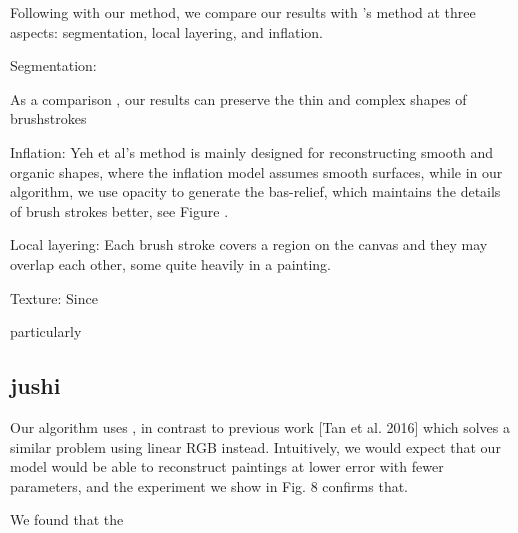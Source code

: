 Following with our method, we compare our results with \cite{yeh2017interactive}'s method at three aspects: segmentation, local layering, and inflation.

Segmentation: 

As a comparison , our results can preserve the thin and complex shapes of brushstrokes     

Inflation: 
Yeh et al's method is mainly designed for reconstructing smooth and organic shapes, where the inflation model assumes smooth surfaces, while in our algorithm, we use opacity to generate the bas-relief, which maintains the details of brush strokes better, see Figure .

Local layering: 
Each brush stroke covers a region on the canvas and they may overlap
each other, some quite heavily in a painting. 

Texture:  
Since \cite{yeh2017interactive}



particularly 


\subsection{jushi}

Our algorithm uses  , in contrast to previous  work [Tan et al. 2016] which solves a similar problem using linear RGB instead. Intuitively, we would expect that our model would be able to reconstruct paintings at lower error with fewer parameters, and the experiment we show in Fig. 8 confirms that. 

We found that the 